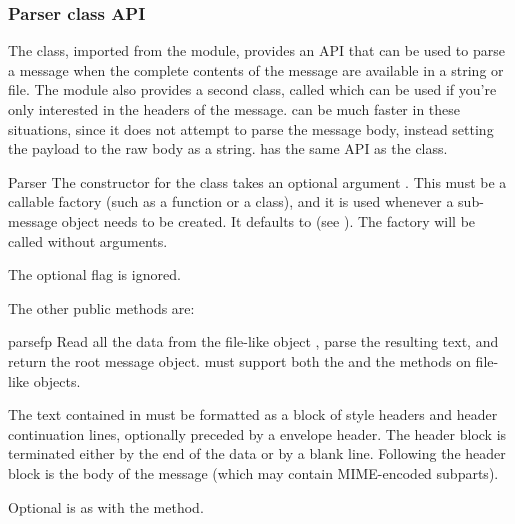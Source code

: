 \subsubsection{Parser class API}

The  class, imported from the  module,
provides an API that can be used to parse a message when the complete contents
of the message are available in a string or file.  The
 module also provides a second class, called
 which can be used if you're only interested in
the headers of the message.  can be much faster in
these situations, since it does not attempt to parse the message body,
instead setting the payload to the raw body as a string.
 has the same API as the  class.

\begin{classdesc}{Parser}{}
The constructor for the  class takes an optional
argument .  This must be a callable factory (such as a
function or a class), and it is used whenever a sub-message object
needs to be created.  It defaults to  (see
).  The factory will be called without
arguments.

The optional  flag is ignored.  

\end{classdesc}

The other public  methods are:

\begin{methoddesc}[Parser]{parse}{fp}
Read all the data from the file-like object , parse the
resulting text, and return the root message object.   must
support both the  and the  methods
on file-like objects.

The text contained in  must be formatted as a block of 
style headers and header continuation lines, optionally preceded by a
envelope header.  The header block is terminated either by the
end of the data or by a blank line.  Following the header block is the
body of the message (which may contain MIME-encoded subparts).

Optional  is as with the  method.

\end{methoddesc}

